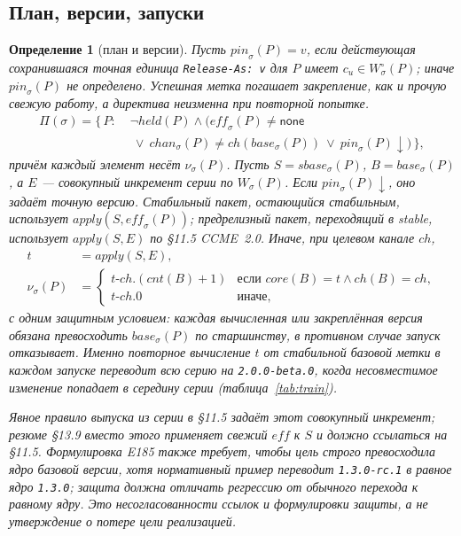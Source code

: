 \documentclass[sigconf,nonacm]{acmart}
\theoremstyle{acmplain}
\theoremstyle{acmdefinition}
\newtheorem{definition}[theorem]{Определение}
\theoremstyle{acmplain}
\newcommand{\code}[1]{\texttt{#1}}
\begin{document}
\subsection{План, версии, запуски}

\begin{definition}[план и версии]
\label{def:plan}
Пусть $\mathit{pin}_\sigma(P)=v$, если действующая сохранившаяся точная единица
\code{Release-As: v} для $P$ имеет $c_u\in W^\circ_\sigma(P)$; иначе
$\mathit{pin}_\sigma(P)$ не определено. Успешная метка погашает закрепление,
как и прочую свежую работу, а директива неизменна при повторной попытке.
\begin{equation}
\begin{aligned}
  \Pi(\sigma) = \{\, P :\;
    &\lnot\mathit{held}(P) \wedge (\mathit{eff}_\sigma(P) \neq
     \mathsf{none} \\[-1mm]
    &\ \lor\ \mathit{chan}_\sigma(P) \neq
     \mathit{ch}(\mathit{base}_\sigma(P))
     \ \lor\ \mathit{pin}_\sigma(P)\downarrow) \,\},
\end{aligned}
\end{equation}
причём каждый элемент несёт $\nu_\sigma(P)$. Пусть
$S=\mathit{sbase}_\sigma(P)$, $B=\mathit{base}_\sigma(P)$, а $E$ ---
совокупный инкремент серии по $W_\sigma(P)$. Если
$\mathit{pin}_\sigma(P)\downarrow$, оно задаёт точную версию. Стабильный пакет, остающийся стабильным,
использует $\mathit{apply}(S,\mathit{eff}_\sigma(P))$; предрелизный пакет,
переходящий в stable, использует $\mathit{apply}(S,E)$ по \S11.5 CCME~2.0.
Иначе, при целевом канале $\mathit{ch}$,
\begin{equation}
\label{eq:train}
\begin{aligned}
  t &= \mathit{apply}(S, E), \\
  \nu_\sigma(P) &=
  \begin{cases}
    t\text{-}\mathit{ch}.(\mathit{cnt}(B){+}1)
      & \text{если } \mathit{core}(B) = t \wedge \mathit{ch}(B) =
        \mathit{ch},\\
    t\text{-}\mathit{ch}.0 & \text{иначе,}
  \end{cases}
\end{aligned}
\end{equation}
с одним защитным условием: каждая вычисленная или закреплённая версия обязана превосходить
$\mathit{base}_\sigma(P)$ по старшинству, в противном случае запуск отказывает. Именно повторное
вычисление $t$ от \emph{стабильной} базовой метки в каждом запуске переводит всю
серию на \code{2.0.0-beta.0}, когда несовместимое изменение попадает в середину серии
(таблица~\ref{tab:train}).

Явное правило выпуска из серии в \S11.5 задаёт этот совокупный инкремент;
резюме \S13.9 вместо этого применяет свежий $\mathit{eff}$ к $S$ и должно
ссылаться на \S11.5. Формулировка E185 также требует, чтобы цель строго
превосходила ядро базовой версии, хотя нормативный пример переводит
\code{1.3.0-rc.1} в равное ядро \code{1.3.0}; защита должна отличать
регрессию от обычного перехода к равному ядру. Это несогласованности ссылок
и формулировки защиты, а не утверждение о потере цели реализацией.
\end{definition}
\end{document}

